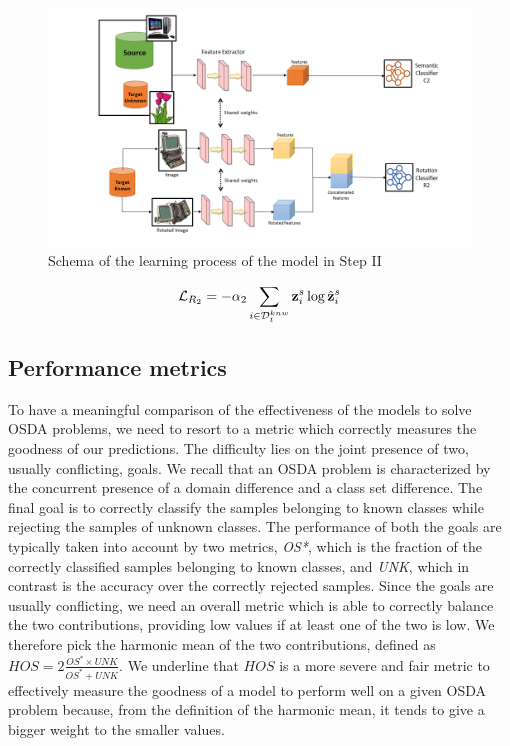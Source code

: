 \documentclass[10pt,twocolumn,letterpaper]{article}
\begin{document}
\begin{figure}[ht]
  \includegraphics[trim= 5.2cm 0cm 2cm 0cm, clip, width=\linewidth ]{scheme_step2.png}
  \caption{\label{fig:step2}\centering Schema of the learning process of the model in Step II}
\end{figure}


\begin{equation}
  \mathcal{L}_{R_2} = -\alpha_2\sum_{i\in\mathcal{D}_t^{knw}} {\bf z}_i^s \log \hat{{\bf z}}_i^s
  \label{eq:baseloss_rot2}
\end{equation}

\subsection{Performance metrics}
\label{sec:performance_metrics}

To have a meaningful comparison of the effectiveness
of the models to solve OSDA problems, we need to resort to a metric which
correctly measures the goodness of our predictions.
The difficulty lies on the joint presence of two, usually conflicting, goals.
We recall that an OSDA problem is characterized by the concurrent presence of
a domain difference and a class set difference.
The final goal is to correctly classify the samples belonging to known classes
while rejecting the samples of unknown classes.
The performance of both the goals are typically taken into account by two metrics, {\it OS*},
which is the fraction of the correctly classified samples belonging to known classes, and {\it UNK},
which in contrast is the accuracy over the correctly rejected samples.
Since the goals are usually conflicting, we need an overall metric which is able to correctly balance
the two contributions, providing low values if at least one of the two is low.
We therefore pick the harmonic mean of the two contributions, defined as $HOS = 2\frac{OS^*\times UNK}{OS^*+UNK}$.
We underline that $HOS$ is a more severe and fair metric to effectively measure the goodness of a model to perform well
on a given OSDA problem because, from the definition of the harmonic mean, it tends to give a bigger weight to the smaller values.
\end{document}
